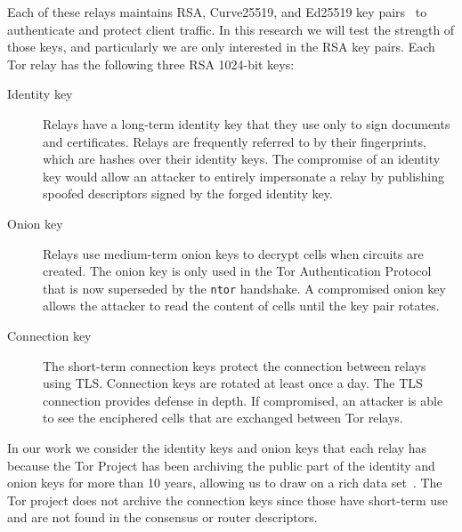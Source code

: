 Each of these relays maintains RSA, Curve25519, and Ed25519 key
pairs~\cite[\S~1.1]{torspec} to authenticate and protect client traffic. In
this research we will test the strength of those keys, and particularly we are
only interested in the RSA key pairs. Each Tor relay has the following three
RSA 1024-bit keys:

\begin{description}
    \item[Identity key] Relays have a long-term identity key that they use only
      to sign documents and certificates.  Relays are frequently referred to by
      their fingerprints, which are hashes over their identity keys.  The
      compromise of an identity key would allow an attacker to entirely
      impersonate a relay by publishing spoofed descriptors signed by the
      forged identity key.

    \item[Onion key]  Relays use medium-term onion keys to decrypt cells when
        circuits are created.  The onion key is only used in the Tor
        Authentication Protocol that is now superseded by the \texttt{ntor} 
        handshake.  A compromised onion key allows the attacker to read 
        the content of cells until the key pair rotates.

    \item[Connection key] The short-term connection keys protect the connection
        between relays using TLS.  Connection keys are rotated at least once a
        day.  The TLS connection provides defense in depth.  If compromised, an
        attacker is able to see the enciphered cells that are exchanged between Tor
        relays.
\end{description}

In our work we consider the identity keys and onion keys that each relay 
has because the Tor Project has been archiving the public part of the 
identity and onion keys for more than 10 years, allowing us to draw on a 
rich data set~\cite{collector}. The Tor project does not archive the 
connection keys since those have short-term use and are not found
in the consensus or router descriptors.


